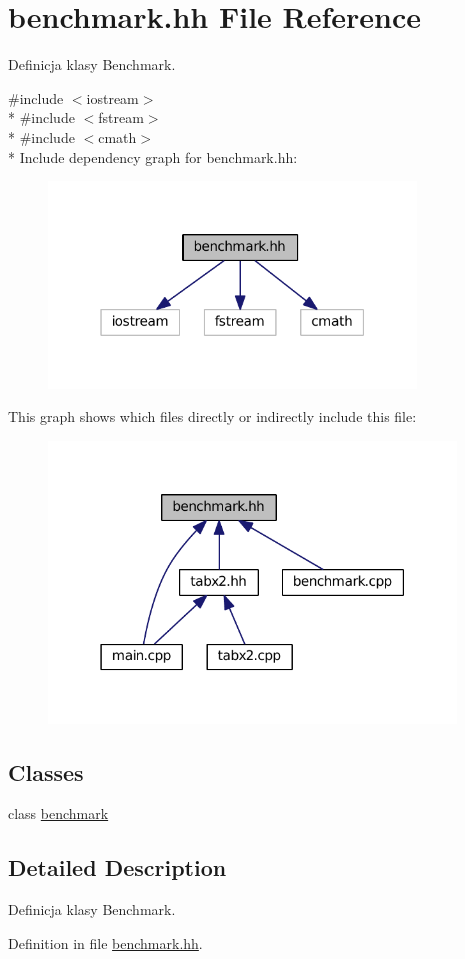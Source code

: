 \hypertarget{benchmark_8hh}{}\section{benchmark.\+hh File Reference}
\label{benchmark_8hh}


Definicja klasy Benchmark.  


{\ttfamily \#include $<$iostream$>$}\\*
{\ttfamily \#include $<$fstream$>$}\\*
{\ttfamily \#include $<$cmath$>$}\\*
Include dependency graph for benchmark.\+hh\+:\nopagebreak
\begin{figure}[H]
\begin{center}
\leavevmode
\includegraphics[width=277pt]{db/d7e/benchmark_8hh__incl}
\end{center}
\end{figure}
This graph shows which files directly or indirectly include this file\+:\nopagebreak
\begin{figure}[H]
\begin{center}
\leavevmode
\includegraphics[width=307pt]{dc/d65/benchmark_8hh__dep__incl}
\end{center}
\end{figure}
\subsection*{Classes}
\begin{DoxyCompactItemize}
\item 
class \hyperlink{classbenchmark}{benchmark}
\end{DoxyCompactItemize}


\subsection{Detailed Description}
Definicja klasy Benchmark. 



Definition in file \hyperlink{benchmark_8hh_source}{benchmark.\+hh}.

